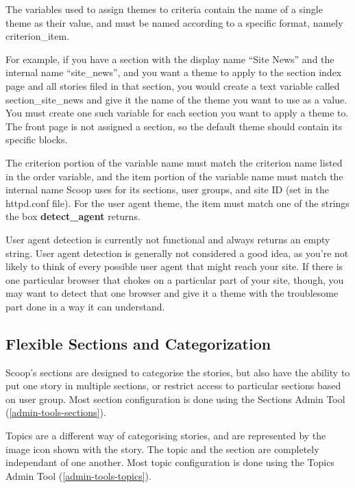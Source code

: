 The variables used to assign themes to criteria contain the name of a single theme as their value, and must be named according to a specific format, namely \latexhtml{$<$}{<}criterion\latexhtml{$>$}{>}\_\latexhtml{$<$}{<}item\latexhtml{$>$}{>}.  

For example, if you have a section with the display name ``Site News'' and the internal name ``site\_news'', and you want a theme to apply to the section index page and all stories filed in that section, you would create a text variable called section\_site\_news and give it the name of the theme you want to use as a value.  You must create one such variable for each section you want to apply a theme to.  The front page is not assigned a section, so the default theme should contain its specific blocks.

The criterion portion of the variable name must match the criterion name listed in the order variable, and the item portion of the variable name must match the internal name Scoop uses for its sections, user groups, and site ID (set in the httpd.conf file).  For the user agent theme, the item must match one of the strings the box {\bf detect\_agent} returns.  

User agent detection is currently not functional and always returns an empty string. User agent detection is generally not considered a good idea, as you're not likely to think of every possible user agent that might reach your site. If there is one particular browser that chokes on a particular part of your site, though, you may want to detect that one browser and give it a theme with the troublesome part done in a way it can understand.

\subsection{Flexible Sections and Categorization}
\label{features-sections}

Scoop's sections are designed to categorise the stories, but also have the ability to put one story in multiple sections, or restrict access to particular sections based on user group.  Most section configuration is done using the Sections Admin Tool (\ref{admin-tools-sections}).

Topics are a different way of categorising stories, and are represented by the image icon shown with the story.  The topic and the section are completely independant of one another.  Most topic configuration is done using the Topics Admin Tool (\ref{admin-tools-topics}).

